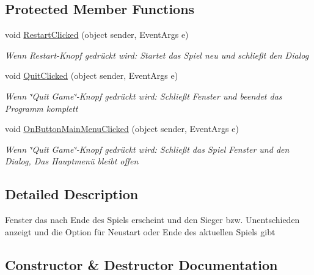 \subsection*{Protected Member Functions}
\begin{DoxyCompactItemize}
\item 
void \mbox{\hyperlink{class_poke_quet_1_1_game_over_dialog_aa12eeeb856f3efec7e3bfff392a59af5}{Restart\+Clicked}} (object sender, Event\+Args e)
\begin{DoxyCompactList}\small\item\em Wenn Restart-\/\+Knopf gedrückt wird\+: Startet das Spiel neu und schließt den Dialog \end{DoxyCompactList}\item 
void \mbox{\hyperlink{class_poke_quet_1_1_game_over_dialog_a1f55fe2f8582123f180ceee6d4ea9150}{Quit\+Clicked}} (object sender, Event\+Args e)
\begin{DoxyCompactList}\small\item\em Wenn \char`\"{}\+Quit Game\char`\"{}-\/\+Knopf gedrückt wird\+: Schließt Fenster und beendet das Programm komplett \end{DoxyCompactList}\item 
void \mbox{\hyperlink{class_poke_quet_1_1_game_over_dialog_a17735956b84e755b1412e6a10ac92ed0}{On\+Button\+Main\+Menu\+Clicked}} (object sender, Event\+Args e)
\begin{DoxyCompactList}\small\item\em Wenn \char`\"{}\+Quit Game\char`\"{}-\/\+Knopf gedrückt wird\+: Schließt das Spiel Fenster und den Dialog, Das Hauptmenü bleibt offen \end{DoxyCompactList}\end{DoxyCompactItemize}


\subsection{Detailed Description}
Fenster das nach Ende des Spiels erscheint und den Sieger bzw. Unentschieden anzeigt und die Option für Neustart oder Ende des aktuellen Spiels gibt 



\subsection{Constructor \& Destructor Documentation}
\mbox{\label{class_poke_quet_1_1_game_over_dialog_a8c93fc8093ac6012aa11d16bac7be605}} 
